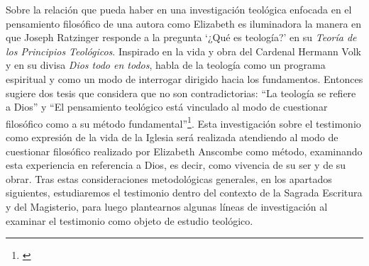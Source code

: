 Sobre la relación que pueda haber en una investigación teológica enfocada en el pensamiento filosófico de una autora como Elizabeth es iluminadora la manera en que Joseph Ratzinger responde a la pregunta \enquote*{¿Qué es teología?} en su \emph{Teoría de los Principios Teológicos}. Inspirado en la vida y obra del Cardenal Hermann Volk y en su divisa \emph{Dios todo en todos}, habla de la teología como un programa espiritual y como un modo de interrogar dirigido hacia los fundamentos. Entonces sugiere dos tesis que considera que no son contradictorias: \enquote{La teología se refiere a Dios} y  \enquote{El pensamiento teológico está vinculado al modo de cuestionar filosófico como a su método fundamental}\footnote{\cite[Cf.~][380]{ratzinger2005teoria}
}.
Esta investigación sobre el testimonio como expresión de la vida de la Iglesia será realizada atendiendo al modo de cuestionar filosófico realizado por Elizabeth Anscombe como método, examinando esta experiencia en referencia a Dios, es decir, como vivencia de su ser y de su obrar. Tras estas consideraciones metodológicas generales, en los apartados siguientes, estudiaremos el testimonio dentro del contexto de la Sagrada Escritura y del Magisterio, para luego plantearnos algunas líneas de investigación al examinar el testimonio como objeto de estudio teológico.

